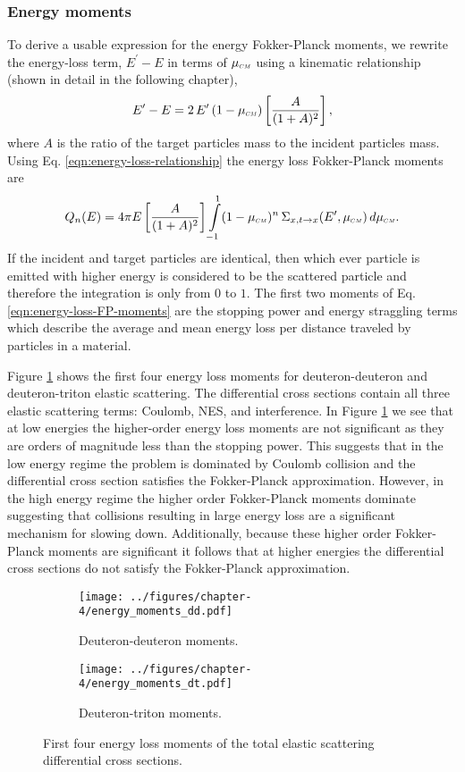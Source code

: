 \subsubsection{Energy moments}
To derive a usable expression for the energy Fokker-Planck moments, we rewrite the energy-loss term, $E^{\prime} - E$ in terms of $\mucm$ using a kinematic relationship (shown in detail in the following chapter),
\begin{equation} \label{eqn:energy-loss-relationship}
  E^{\prime} - E = 2 \, E^{\prime} \, (1 - \mucm) \left[ \dfrac{A}{(1+A)^2} \right],
\end{equation}
where $A$ is the ratio of the target particles mass to the incident particles mass. Using Eq. \eqref{eqn:energy-loss-relationship} the energy loss Fokker-Planck moments are
\begin{equation} \label{eqn:energy-loss-FP-moments}
  Q_n(E) = 4\pi E \left[ \dfrac{A}{(1+A)^2} \right] \int\limits_{-1}^{1} (1 - \mucm)^n \, \Sigma_{x,t\rightarrow x}(E^{\prime},\mucm) \, d\mucm.
\end{equation}
If the incident and target particles are identical, then which ever particle is emitted with higher energy is considered to be the scattered particle and therefore the integration is only from $0$ to $1$. The first two moments of Eq. \eqref{eqn:energy-loss-FP-moments} are the stopping power and energy straggling terms which describe the average and mean energy loss per distance traveled by particles in a material. 

Figure \ref{fig:energy-loss-moments} shows the first four energy loss moments for deuteron-deuteron and deuteron-triton elastic scattering. The differential cross sections contain all three elastic scattering terms: Coulomb, NES, and interference. In Figure \ref{fig:energy-loss-moments} we see that at low energies the higher-order energy loss moments are not significant as they are orders of magnitude less than the stopping power. This suggests that in the low energy regime the problem is dominated by Coulomb collision and the differential cross section satisfies the Fokker-Planck approximation. However, in the high energy regime the higher order Fokker-Planck moments dominate suggesting that collisions resulting in large energy loss are a significant mechanism for slowing down. Additionally, because these higher order Fokker-Planck moments are significant it follows that at higher energies the differential cross sections do not satisfy the Fokker-Planck approximation. 
\begin{figure}[!htb]
  \centering
  \begin{subfigure}{.45\textwidth}
    \centering
    \texttt{[image: ../figures/chapter-4/energy\_moments\_dd.pdf]}
    \caption{Deuteron-deuteron moments.}
  \end{subfigure}%
  \begin{subfigure}{.45\textwidth}
    \centering
    \texttt{[image: ../figures/chapter-4/energy\_moments\_dt.pdf]}
    \caption{Deuteron-triton moments.}
  \end{subfigure}
  \caption{First four energy loss moments of the total elastic scattering differential cross sections.}
  \label{fig:energy-loss-moments}
\end{figure}
